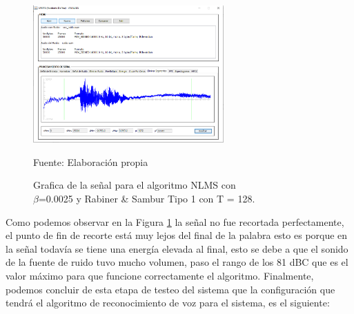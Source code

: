 \begin{figure}[H]
\captionsetup{justification=centering}
\begin{center}
\includegraphics[width=0.65\textwidth]{Imagenes/Cap3/image084}
\end{center}
\begin{center}
\vskip -0.5cm
\caption{\small{Grafica de la señal para el algoritmo NLMS con \\ $\beta$=0.0025 y Rabiner \& Sambur Tipo 1 con T = 128.}}
\label{fig:figura3.84}
{\small{Fuente: Elaboración propia}}
\end{center}
\end{figure}

\vskip -0.5cm
Como podemos observar en la Figura \ref{fig:figura3.84} la señal no fue recortada perfectamente, el punto de fin de recorte está muy lejos del final de la palabra esto es porque en la señal todavía se tiene una energía elevada al final, esto se debe a que el sonido de la fuente de ruido tuvo mucho volumen, paso el rango de los 81 dBC que es el valor máximo para que funcione correctamente el algoritmo.
\vskip 0.5cm
Finalmente, podemos concluir de esta etapa de testeo del sistema que la configuración que tendrá el algoritmo de reconocimiento de voz para el sistema, es el siguiente:

